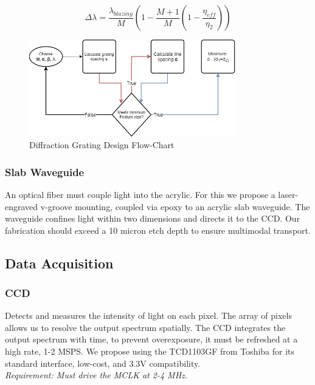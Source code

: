 \documentclass{article}
\begin{document}
        \begin{equation}\label{eq:fsr}
            \Delta \lambda = \frac{\lambda_{blazing}}{M}(1- \frac{M+1}{M}(1-\frac{\eta_{eff}}{\eta_{2}}))
        \end{equation}
        
        \begin{figure}[H]
        \centering
        \includegraphics[width=0.8\textwidth]{images/grating_types.png}
        \caption{\label{fig:gratingflowchart}Diffraction Grating Design Flow-Chart}
        \end{figure}       
        
        \subsubsection{Slab Waveguide}
        An optical fiber must couple light into the acrylic. For this we propose a laser-engraved v-groove mounting, coupled via epoxy to an acrylic slab waveguide. The waveguide confines light within two dimensions and directs it to the CCD. Our fabrication should exceed a 10 micron etch depth to ensure multimodal transport.
        
        
    \subsection{Data Acquisition}
        \subsubsection{CCD}
       Detects and measures the intensity of light on each pixel. The array of pixels allows us to resolve the output spectrum spatially. The CCD integrates the output spectrum with time, to prevent overexposure, it must be refreshed at a high rate, 1-2 MSPS. We propose using the TCD1103GF from Toshiba for its standard interface, low-cost, and 3.3V compatibility.
        \textit{\\Requirement: Must drive the MCLK at 2-4 MHz. }
        
\end{document}
